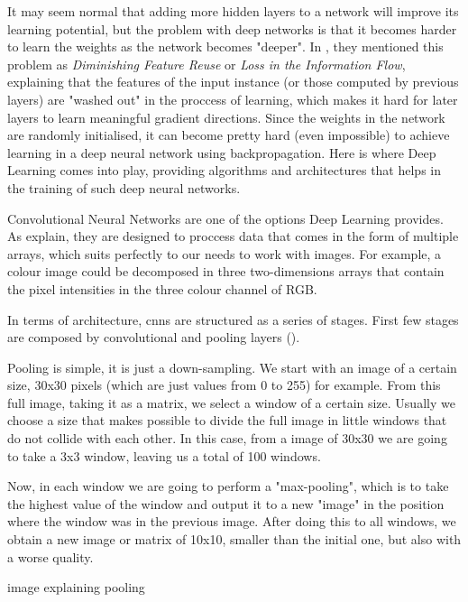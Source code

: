 It may seem normal that adding more hidden layers to a network will improve its learning potential, but the problem with deep networks is that it becomes harder to learn the weights as the network becomes "deeper". In \cite{huang2016deep}, they mentioned this problem as \textit{Diminishing Feature Reuse} or \textit{Loss in the Information Flow}, explaining that the features of the input instance (or those computed by previous layers) are "washed out" in the proccess of learning, which makes it hard for later layers to learn meaningful gradient directions. Since the weights in the network are randomly initialised, it can become pretty hard (even impossible) to achieve learning in a deep neural network using backpropagation. Here is where Deep Learning comes into play, providing algorithms and architectures that helps in the training of such deep neural networks. 

Convolutional Neural Networks are one of the options Deep Learning provides. As \cite{lecun2015deep} explain, they are designed to proccess data that comes in the form of multiple arrays, which suits perfectly to our needs to work with images. For example, a colour image could be decomposed in three two-dimensions arrays that contain the pixel intensities in the three colour channel of RGB. 


In terms of architecture, \glspl{cnn} are structured as a series of stages. First few stages are composed by convolutional and pooling layers (\cite{lecun2015deep}). 

Pooling is simple, it is just a down-sampling. We start with an image of a certain size, 30x30 pixels (which are just values from 0 to 255) for example. From this full image, taking it as a matrix, we select a window of a certain size. Usually we choose a size that makes possible to divide the full image in little windows that do not collide with each other. In this case, from a image of 30x30 we are going to take a 3x3 window, leaving us a total of 100 windows. 

Now, in each window we are going to perform a "max-pooling", which is to take the highest value of the window and output it to a new "image" in the position where the window was in the previous image. After doing this to all windows, we obtain a new image or matrix of 10x10, smaller than the initial one, but also with a worse quality.

image explaining pooling

